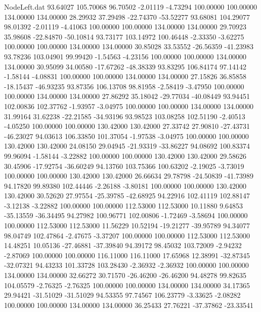 \begin{filecontents}{NodeLeft.dat}
  93.64027  105.70068   96.70502    -2.01119   -4.73294  100.00000  100.00000  134.00000  134.00000   28.29932   37.29498  -22.74370  -53.52277
  93.68081  104.29077   98.01392    -2.01119   -4.41063  100.00000  100.00000  134.00000  134.00000   29.70923   35.98608  -22.84870  -50.10814
  93.73177  103.14972  100.46448    -2.33350   -3.62275  100.00000  100.00000  134.00000  134.00000   30.85028   33.53552  -26.56359  -41.23983
  93.78236  103.04901   99.99420    -1.54563   -4.23156  100.00000  100.00000  134.00000  134.00000   30.95099   34.00580  -17.67262  -48.38339
  93.83295  106.84174   97.14142    -1.58144   -4.08831  100.00000  100.00000  134.00000  134.00000   27.15826   36.85858  -18.15437  -46.93235
  93.87356  106.13708   98.81958    -2.58419   -3.47950  100.00000  100.00000  134.00000  134.00000   27.86292   35.18042  -29.77034  -40.08449
  93.94451  102.00836  102.37762    -1.93957   -3.04975  100.00000  100.00000  134.00000  134.00000   31.99164   31.62238  -22.21585  -34.93196
  93.98523  103.08258  102.51190    -2.40513   -4.05250  100.00000  100.00000  130.42000  130.42000   27.33742   27.90810  -27.43731  -46.23027
  94.03613  106.33850  101.37054    -1.97538   -3.04975  100.00000  100.00000  130.42000  130.42000   24.08150   29.04945  -21.93319  -33.86227
  94.08692  100.83374   99.96094    -1.58144   -3.22882  100.00000  100.00000  130.42000  130.42000   29.58626   30.45906  -17.92754  -36.60249
  94.13760  103.75366  100.63202    -2.19025   -3.73019  100.00000  100.00000  130.42000  130.42000   26.66634   29.78798  -24.50839  -41.73989
  94.17820   99.89380  102.44446    -2.26188   -3.80181  100.00000  100.00000  130.42000  130.42000   30.52620   27.97554  -25.39785  -42.68925
  94.22916  102.41119  102.88147    -3.12138   -3.22882  100.00000  100.00000  112.53000  112.53000   10.11880    9.64853  -35.13559  -36.34495
  94.27982  100.96771  102.00806    -1.72469   -3.58694  100.00000  100.00000  112.53000  112.53000   11.56229   10.52194  -19.21277  -39.95789
  94.34077   98.04749  102.47864    -2.47675   -3.37207  100.00000  100.00000  112.53000  112.53000   14.48251   10.05136  -27.46881  -37.39840
  94.39172   98.45032  103.72009    -2.94232   -2.87069  100.00000  100.00000  116.11000  116.11000   17.65968   12.38991  -32.87345  -32.07321
  94.43233  101.33728  103.28430    -2.36932   -2.36932  100.00000  100.00000  134.00000  134.00000   32.66272   30.71570  -26.46200  -26.46200
  94.48278   99.82635  104.05579    -2.76325   -2.76325  100.00000  100.00000  134.00000  134.00000   34.17365   29.94421  -31.51029  -31.51029
  94.53355   97.74567  106.23779    -3.33625   -2.08282  100.00000  100.00000  134.00000  134.00000   36.25433   27.76221  -37.37862  -23.33541

\end{filecontents}
